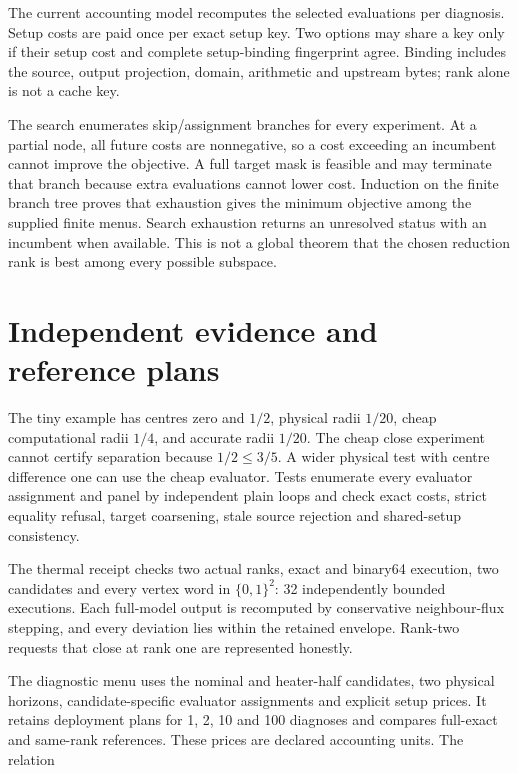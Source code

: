 \documentclass[
  11pt,
  a4paper,
]{report}
\begin{document}
The current accounting model recomputes the selected evaluations per
diagnosis. Setup costs are paid once per exact setup key. Two options
may share a key only if their setup cost and complete setup-binding
fingerprint agree. Binding includes the source, output projection,
domain, arithmetic and upstream bytes; rank alone is not a cache key.

The search enumerates skip/assignment branches for every experiment. At
a partial node, all future costs are nonnegative, so a cost exceeding an
incumbent cannot improve the objective. A full target mask is feasible
and may terminate that branch because extra evaluations cannot lower
cost. Induction on the finite branch tree proves that exhaustion gives
the minimum objective among the supplied finite menus. Search exhaustion
returns an unresolved status with an incumbent when available. This is
not a global theorem that the chosen reduction rank is best among every
possible subspace.

\hypertarget{independent-evidence-and-reference-plans}{%
\section{Independent evidence and reference
plans}\label{independent-evidence-and-reference-plans}}

The tiny example has centres zero and \(1/2\), physical radii \(1/20\),
cheap computational radii \(1/4\), and accurate radii \(1/20\). The
cheap close experiment cannot certify separation because \(1/2\le3/5\).
A wider physical test with centre difference one can use the cheap
evaluator. Tests enumerate every evaluator assignment and panel by
independent plain loops and check exact costs, strict equality refusal,
target coarsening, stale source rejection and shared-setup consistency.

The thermal receipt checks two actual ranks, exact and binary64
execution, two candidates and every vertex word in \(\{0,1\}^2\): 32
independently bounded executions. Each full-model output is recomputed
by conservative neighbour-flux stepping, and every deviation lies within
the retained envelope. Rank-two requests that close at rank one are
represented honestly.

The diagnostic menu uses the nominal and heater-half candidates, two
physical horizons, candidate-specific evaluator assignments and explicit
setup prices. It retains deployment plans for 1, 2, 10 and 100 diagnoses
and compares full-exact and same-rank references. These prices are
declared accounting units. The relation
\end{document}
